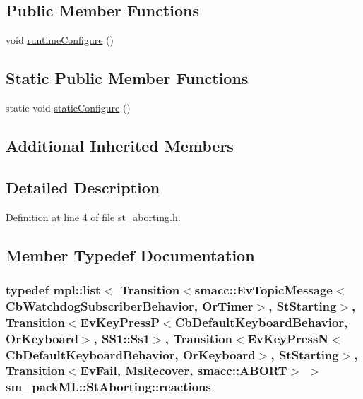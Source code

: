 \subsection*{Public Member Functions}
\begin{DoxyCompactItemize}
\item 
void \hyperlink{structsm__packML_1_1StAborting_a64d1081ac0e6f4ee49e12cc80eda621b}{runtime\+Configure} ()
\end{DoxyCompactItemize}
\subsection*{Static Public Member Functions}
\begin{DoxyCompactItemize}
\item 
static void \hyperlink{structsm__packML_1_1StAborting_a5aee0e07b9d76338736e549f39e6784a}{static\+Configure} ()
\end{DoxyCompactItemize}
\subsection*{Additional Inherited Members}


\subsection{Detailed Description}


Definition at line 4 of file st\+\_\+aborting.\+h.



\subsection{Member Typedef Documentation}
\subsubsection[{\texorpdfstring{reactions}{reactions}}]{\setlength{\rightskip}{0pt plus 5cm}typedef mpl\+::list$<$ Transition$<${\bf smacc\+::\+Ev\+Topic\+Message}$<${\bf Cb\+Watchdog\+Subscriber\+Behavior}, {\bf Or\+Timer}$>$, {\bf St\+Starting}$>$, Transition$<$Ev\+Key\+PressP$<$Cb\+Default\+Keyboard\+Behavior, {\bf Or\+Keyboard}$>$, {\bf S\+S1\+::\+Ss1}$>$, Transition$<$Ev\+Key\+PressN$<$Cb\+Default\+Keyboard\+Behavior, {\bf Or\+Keyboard}$>$, {\bf St\+Starting}$>$, Transition$<${\bf Ev\+Fail}, {\bf Ms\+Recover}, {\bf smacc\+::\+A\+B\+O\+RT}$>$ $>$ {\bf sm\+\_\+pack\+M\+L\+::\+St\+Aborting\+::reactions}}\hypertarget{structsm__packML_1_1StAborting_a1744e2a5b809814643a4e0f6c0ebdfcf}{}\label{structsm__packML_1_1StAborting_a1744e2a5b809814643a4e0f6c0ebdfcf}


